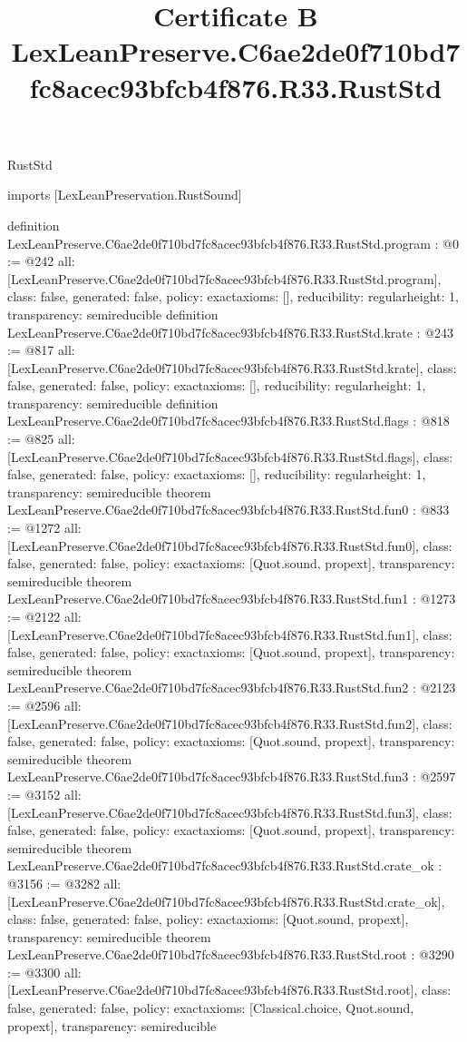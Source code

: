 \begin{lexlean}{RustStd}
\title{Certificate B LexLeanPreserve.C6ae2de0f710bd7fc8acec93bfcb4f876.R33.RustStd}
\begin{coremodule}
imports [LexLeanPreservation.RustSound]

definition LexLeanPreserve.C6ae2de0f710bd7fc8acec93bfcb4f876.R33.RustStd.program : @0 := @242 {
  all: [LexLeanPreserve.C6ae2de0f710bd7fc8acec93bfcb4f876.R33.RustStd.program],
  class: false,
  generated: false,
  policy: exact{axioms: []},
  reducibility: regular{height: 1},
  transparency: semireducible
}
definition LexLeanPreserve.C6ae2de0f710bd7fc8acec93bfcb4f876.R33.RustStd.krate : @243 := @817 {
  all: [LexLeanPreserve.C6ae2de0f710bd7fc8acec93bfcb4f876.R33.RustStd.krate],
  class: false,
  generated: false,
  policy: exact{axioms: []},
  reducibility: regular{height: 1},
  transparency: semireducible
}
definition LexLeanPreserve.C6ae2de0f710bd7fc8acec93bfcb4f876.R33.RustStd.flags : @818 := @825 {
  all: [LexLeanPreserve.C6ae2de0f710bd7fc8acec93bfcb4f876.R33.RustStd.flags],
  class: false,
  generated: false,
  policy: exact{axioms: []},
  reducibility: regular{height: 1},
  transparency: semireducible
}
theorem LexLeanPreserve.C6ae2de0f710bd7fc8acec93bfcb4f876.R33.RustStd.fun0 : @833 := @1272 {
  all: [LexLeanPreserve.C6ae2de0f710bd7fc8acec93bfcb4f876.R33.RustStd.fun0],
  class: false,
  generated: false,
  policy: exact{axioms: [Quot.sound, propext]},
  transparency: semireducible
}
theorem LexLeanPreserve.C6ae2de0f710bd7fc8acec93bfcb4f876.R33.RustStd.fun1 : @1273 := @2122 {
  all: [LexLeanPreserve.C6ae2de0f710bd7fc8acec93bfcb4f876.R33.RustStd.fun1],
  class: false,
  generated: false,
  policy: exact{axioms: [Quot.sound, propext]},
  transparency: semireducible
}
theorem LexLeanPreserve.C6ae2de0f710bd7fc8acec93bfcb4f876.R33.RustStd.fun2 : @2123 := @2596 {
  all: [LexLeanPreserve.C6ae2de0f710bd7fc8acec93bfcb4f876.R33.RustStd.fun2],
  class: false,
  generated: false,
  policy: exact{axioms: [Quot.sound, propext]},
  transparency: semireducible
}
theorem LexLeanPreserve.C6ae2de0f710bd7fc8acec93bfcb4f876.R33.RustStd.fun3 : @2597 := @3152 {
  all: [LexLeanPreserve.C6ae2de0f710bd7fc8acec93bfcb4f876.R33.RustStd.fun3],
  class: false,
  generated: false,
  policy: exact{axioms: [Quot.sound, propext]},
  transparency: semireducible
}
theorem LexLeanPreserve.C6ae2de0f710bd7fc8acec93bfcb4f876.R33.RustStd.crate_ok : @3156 := @3282 {
  all: [LexLeanPreserve.C6ae2de0f710bd7fc8acec93bfcb4f876.R33.RustStd.crate_ok],
  class: false,
  generated: false,
  policy: exact{axioms: [Quot.sound, propext]},
  transparency: semireducible
}
theorem LexLeanPreserve.C6ae2de0f710bd7fc8acec93bfcb4f876.R33.RustStd.root : @3290 := @3300 {
  all: [LexLeanPreserve.C6ae2de0f710bd7fc8acec93bfcb4f876.R33.RustStd.root],
  class: false,
  generated: false,
  policy: exact{axioms: [Classical.choice, Quot.sound, propext]},
  transparency: semireducible
}


\end{coremodule}
\end{lexlean}
